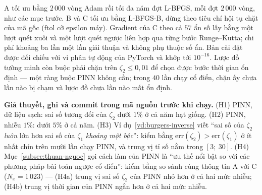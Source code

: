 A tối ưu bằng $2\,000$ vòng Adam rồi tối đa năm đợt L-BFGS, mỗi đợt $2\,000$
vòng, như các mục trước. B và C tối ưu bằng L-BFGS-B, dừng theo tiêu chí hội tụ
chặt của mã gốc ($\mathrm{ftol}$ cỡ epsilon máy). Gradient của C theo cả $57$ ẩn
số lấy bằng một lượt quét xuôi và một lượt quét ngược liên hợp qua từng bước
Runge--Kutta; chi phí khoảng ba lần một lần giải thuận và không phụ thuộc số ẩn.
Bản cài đặt được đối chiếu với vi phân tự động của PyTorch và khớp tới
$10^{-16}$. Lược đồ tường minh còn buộc phải chặn trên $\zeta_2 \le 0{,}01$ để
chọn được bước thời gian ổn định --- một ràng buộc PINN không cần; trong $40$ lần
chạy cổ điển, chặn ấy chưa lần nào bị chạm và lược đồ chưa lần nào mất ổn định.

\textbf{Giả thuyết, ghi và commit trong mã nguồn trước khi chạy.}
(H1) PINN, dữ liệu sạch: sai số tương đối của $\zeta_2$ dưới $1\%$ ở cả năm hạt
giống. (H2) PINN, nhiễu $1\%$: dưới $5\%$ ở cả năm. (H3) Ví
dụ~\ref{vd:burgers-inverse} viết ``sai số của $\zeta_2$ \emph{luôn} lớn hơn sai
số của $\zeta_1$ \emph{khoảng một bậc}'': kiểm bằng
$\mathrm{err}(\zeta_2) > \mathrm{err}(\zeta_1)$ ở ít nhất chín trên mười lần chạy
PINN, và trung vị tỉ số nằm trong $[3;\ 30]$. (H4) Mục~\ref{subsec:thuan-nguoc}
gọi cách làm của PINN là ``ưu thế nổi bật so với các phương pháp bài toán ngược
cổ điển'': kiểm bằng so sánh cùng thông tin A với C ($N_x = 1\,023$) --- (H4a)
trung vị sai số $\zeta_2$ của PINN nhỏ hơn ở cả hai mức nhiễu; (H4b) trung vị
thời gian của PINN ngắn hơn ở cả hai mức nhiễu.

